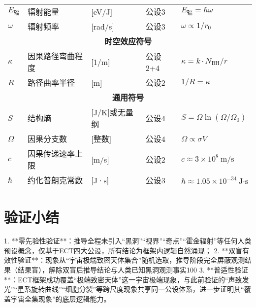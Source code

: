 \documentclass{article}
\begin{document}
\begin{table}[h!]
{\begin{tabular}{l l l l l}
\(E_{\text{辐}}\)   & 辐射能量                        & [eV/J]             & 公设3                    & \(E_{\text{辐}} = \hbar \omega\) \\
\(\omega\)           & 辐射频率                        & [rad/s]            & 公设3                    & \(\omega \propto 1/r_0\) \\
\midrule
\multicolumn{5}{c}{\textbf{时空效应符号}} \\
\midrule
\(\kappa\)           & 因果路径弯曲程度                & [1/m]              & 公设2+4                  & \(\kappa = k \cdot N_{\text{BH}}/r\) \\
\(R\)                & 路径曲率半径                    & [m]                & 公设2                    & \(1/R = \kappa\) \\
\midrule
\multicolumn{5}{c}{\textbf{通用符号}} \\
\midrule
\(S\)               & 结构熵                          & [J/K]或无量纲      & 公设4                    & \(S = \Omega \ln(\Omega/\Omega_0)\) \\
\(\Omega\)           & 因果分支数                      & [整数]             & 公设4                    & \(\Omega \propto \sigma V\) \\
\(c\)                & 因果传递速率上限                & [m/s]              & 公设2                    & \(c \approx 3×10^8\ \text{m/s}\) \\
\(\hbar\)            & 约化普朗克常数                  & [J·s]              & 公设3                    & \(\hbar \approx 1.05×10^{-34}\ \text{J·s}\) \\
\bottomrule
\end{tabular}%
}
\end{table}


\section{验证小结}
1. **零先验性验证**：推导全程未引入“黑洞”“视界”“奇点”“霍金辐射”等任何人类预设概念，仅基于ECT四大公设，所有结论为框架内逻辑自然涌现；  
2. **双盲有效性验证**：现象从“宇宙极端致密天体集合”随机选取，推导阶段完全屏蔽观测结果（结果盲），解除双盲后推导结论与人类已知黑洞观测事实100%
3. **普适性验证**：ECT框架成功覆盖“极端致密天体”这一宇宙极端现象，与此前验证的“声致发光”“星系旋转曲线”“细胞分裂”等跨尺度现象共享同一公设体系，进一步证明其“覆盖宇宙全集现象”的底层逻辑能力。
\end{document}
